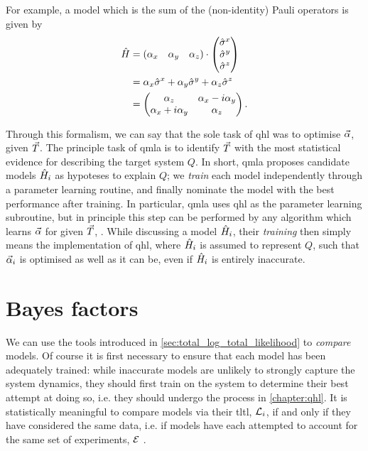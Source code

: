 For example, a model which is the sum of the (non-identity) Pauli operators is given by
\begin{align}
    \label{eqn:pauli_sum_model}
    \begin{split}
        \hat{H} &= \begin{matrix}(\alpha_x & \alpha_y & \alpha_z)\end{matrix} \cdot \left(\begin{matrix}\hat{\sigma}^{x} \\ \hat{\sigma}^{y} \\ \hat{\sigma}^{z}\end{matrix}\right) \\
        &= \alpha_x \hat{\sigma}^{x} + \alpha_y \hat{\sigma}^{y} + \alpha_z \hat{\sigma}^{z} \\
        &= \begin{pmatrix}
            \alpha_z & \alpha_x - i \alpha_y \\
            \alpha_x + i\alpha_y & \alpha_z
        \end{pmatrix}.
    \end{split}
\end{align}
\par 

Through this formalism, we can say that the sole task of \gls{qhl} was to optimise $\vec{\alpha}$, given ${ \vec{T} }$. 
The principle task of \gls{qmla} is to identify ${ \vec{T} }$ with the most statistical evidence 
    for describing the target system $Q$. 
In short, \gls{qmla} proposes candidate models $\hat{H}_i$ as hypoteses to explain $Q$; 
    we \emph{train} each model independently through a parameter learning routine, 
    and finally nominate the model with the best performance after training. 
In particular, \gls{qmla} uses \gls{qhl} as the parameter learning subroutine, 
    but in principle this step can be performed by any algorithm which learns $\vec{\alpha}$ for given ${ \vec{T} }$, 
    \cite{wang2015hamiltonian, krastanov2019stochastic, flurin2020using, niu2019learning, 
    greplova2017quantum,lokhov2018optimal, acampora2019evolutionary}. 
While discussing a model $\hat{H}_i$, their \emph{training} then simply means the implementation 
    of \gls{qhl}, where $\hat{H}_i$ is assumed to represent $Q$, 
    such that $\vec{\alpha}_i$ is optimised as well as it can be, even if $\hat{H}_i$ is entirely inaccurate. 

\section{Bayes factors}\label{sec:bayes_factors}
We can use the tools introduced in \cref{sec:total_log_total_likelihood} to \emph{compare} models. 
Of course it is first necessary to ensure that each model has  
    been adequately trained: while inaccurate models are unlikely to strongly 
    capture the system dynamics, they should first train on the system 
    to determine their best attempt at doing so, 
    i.e. they should undergo the process in \cref{chapter:qhl}.
It is statistically meaningful to compare models via their \gls{tltl}, ${\mathcal{L}}_i$, 
    if and only if they have considered the same data, 
    i.e. if models have each attempted to account for the same set of experiments, ${ \mathcal{E} }$ \cite{kass1995bayes}.
\par 

